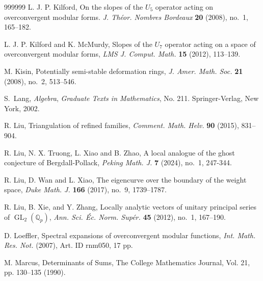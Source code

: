 \documentclass[12pt]{amsart}
\theoremstyle{definition}
\numberwithin{equation}{subsection}
\def\QQ{\mathbb{Q}}
\DeclareMathOperator{\GL}{GL}
\begin{document}
\begin{thebibliography}{999999}
L. J. P. Kilford, On the slopes of the $U_5$ operator acting on overconvergent modular forms. {\it J. Th\'eor. Nombres Bordeaux} {\bf 20} (2008), no.~1, 165--182.

L. J. P. Kilford and K. McMurdy, Slopes of the $U_7$ operator acting on a space of overconvergent modular forms, {\it LMS J. Comput. Math.} {\bf 15} (2012), 113--139.



M. Kisin,
Potentially semi-stable deformation rings, {\it J. Amer. Math. Soc.} {\bf 21} (2008), no.~2, 513--546.




S.~Lang, {\it Algebra},  {\it Graduate Texts in Mathematics}, No. 211. Springer-Verlag, New York, 2002.

R. Liu, Triangulation of refined families, {\it Comment. Math. Helv.} {\bf90} (2015),  831--904. 

R. Liu,  N. X. Truong, L. Xiao and B. Zhao,  
A local analogue of the ghost conjecture of Bergdall-Pollack, {\it Peking Math. J.} {\bf 7} (2024), no.~1, 247-344. 

R. Liu, D. Wan and L. Xiao, The eigencurve over the boundary of the
weight space, {\it Duke Math. J.} {\bf 166} (2017), no.~9, 1739--1787.

R. Liu, B. Xie, and Y. Zhang, Locally analytic vectors of unitary principal series of $\GL_2(\QQ_p)$, {\it Ann. Sci. \'Ec. Norm. Sup\'er.} {\bf 45} (2012), no.~1, 167--190.

D. Loeffler, Spectral expansions of overconvergent modular functions, {\it Int. Math. Res. Not.}  (2007), Art. ID rnm050, 17 pp.

M. Marcus, Determinants of Sums, The College Mathematics Journal, Vol. 21, pp. 130--135 (1990).


\end{thebibliography}
\end{document}
